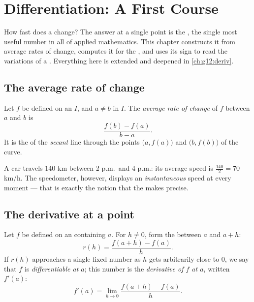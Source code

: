 \chapter{Differentiation: A First Course}\label{ch:g11:deriv}

How fast does a  change? The answer at a single point is the
\emph{}, the single most useful number in all of applied
mathematics. This chapter constructs it from average rates of change,
computes it for the , and uses its sign to read the
variations of a . Everything here is extended and deepened in
\cref{ch:g12:deriv}.

\section{The average rate of change}

\begin{definition}\label{def:g11:deriv:rate}
Let $f$ be defined on an  $I$, and $a \neq b$ in $I$. The
\emph{average rate of change} of $f$ between
$a$ and $b$ is
\[
\frac{f(b) - f(a)}{b - a}.
\]
It is the  of the \emph{secant} line through the points
$\bigl(a, f(a)\bigr)$ and $\bigl(b, f(b)\bigr)$ of the curve.
\end{definition}

\begin{example}
A car travels $140$ km between 2 p.m.\ and 4 p.m.: its average speed is
$\frac{140}{2} = 70$ km/h. The speedometer, however, displays an
\emph{instantaneous} speed at every moment --- that is exactly the notion
that the  makes precise.
\end{example}

\section{The derivative at a point}

\begin{definition}\label{def:g11:deriv:derivative}
Let $f$ be defined on an  containing $a$. For $h \neq 0$, form the
 between $a$ and $a + h$:
\[
r(h) = \frac{f(a+h) - f(a)}{h}.
\]
If $r(h)$ approaches a single fixed number as $h$ gets arbitrarily close to
$0$, we say that $f$ is \emph{differentiable at $a$};
this number is the \emph{derivative of $f$ at $a$}, written $f'(a)$:
\[
f'(a) = \lim_{h \to 0} \frac{f(a+h) - f(a)}{h}.
\]
\end{definition}


